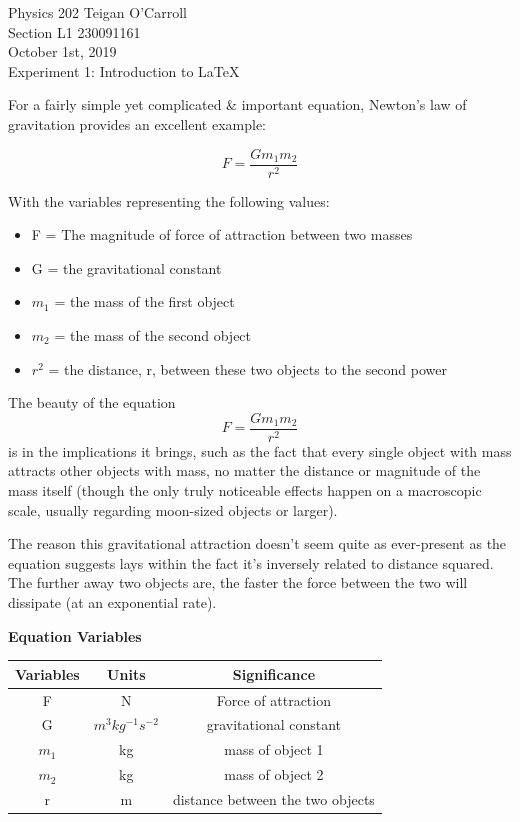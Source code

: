 \documentclass[12pt]{report} %
\begin{document}
Physics 202 \hfill Teigan O'Carroll \\
Section L1 \hfill 230091161 \\
October 1st, 2019 \hfill \\

\vspace{10 mm}
\Large
Experiment 1: Introduction to \LaTeX
\vspace{10 mm}
\normalsize

For a fairly simple yet complicated \& important equation, Newton's law of gravitation provides an excellent example:

\begin{displaymath}
F = \frac{{G}{m_{1}}{m_{2}}}{r^2}
\end{displaymath}

With the variables representing the following values:
\begin{itemize}
    \item F = The magnitude of force of attraction between two masses
    \item G = the gravitational constant
    \item $m_{1}$ = the mass of the first object
    \item $m_{2}$ = the mass of the second object
    \item $r^2$ = the distance, r, between these two objects to the second power
\end{itemize}

\vspace{10 mm}
The beauty of the equation 
\[F = \frac{{G}{m_{1}}{m_{2}}}{r^2}\]%
is in the implications it brings, such as the fact that every single object with mass attracts other objects with mass, no matter the distance or magnitude of the mass itself (though the only truly noticeable effects happen on a macroscopic scale, usually regarding moon-sized objects or larger). 

\vspace{10 mm}
The reason this gravitational attraction doesn't seem quite as ever-present as the equation suggests lays within the fact it's inversely related to distance squared. The further away two objects are, the faster the force between the two will dissipate (at an exponential rate).

\vspace{10 mm}
\begin{center}
{\bf Equation Variables}\\
\vspace{5mm}
\begin{tabular}{| c | c | c |}
\hline
Variables & Units & Significance \\
\hline F
& N
& Force of attraction \\
\hline G
& ${m^3}{kg^{-1}}{s^{-2}}$
& gravitational constant
\\
\hline $m_{1}$
& kg
& mass of object 1\\
\hline $m_{2}$
& kg
& mass of object 2\\
\hline r
& m
& distance between the two objects\\
\hline
\end{tabular}
\end{center}
\end{document}
